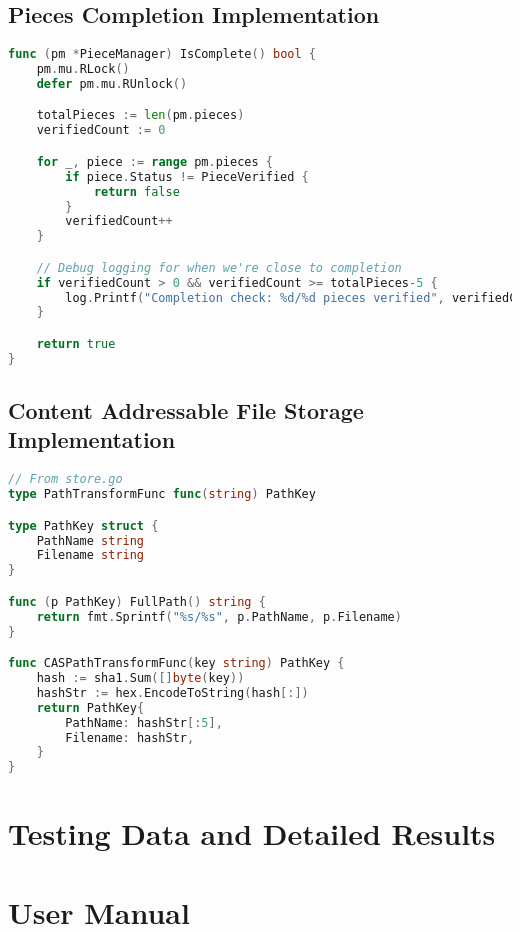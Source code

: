 \documentclass[12pt,a4paper]{report}
\begin{document}
\section{Pieces Completion Implementation}
\begin{lstlisting}[language=Go, caption={Pieces Completion Code}, label={lst:piece-completion}]
func (pm *PieceManager) IsComplete() bool {
	pm.mu.RLock()
	defer pm.mu.RUnlock()

	totalPieces := len(pm.pieces)
	verifiedCount := 0

	for _, piece := range pm.pieces {
		if piece.Status != PieceVerified {
			return false
		}
		verifiedCount++
	}

	// Debug logging for when we're close to completion
	if verifiedCount > 0 && verifiedCount >= totalPieces-5 {
		log.Printf("Completion check: %d/%d pieces verified", verifiedCount, totalPieces)
	}

	return true
}
\end{lstlisting}

\section{Content Addressable File Storage Implementation}
\begin{lstlisting}[language=Go, caption={Content Addressable File/Chunk Code}, label={lst:cas-storage}]
  // From store.go
type PathTransformFunc func(string) PathKey

type PathKey struct {
    PathName string
    Filename string
}

func (p PathKey) FullPath() string {
    return fmt.Sprintf("%s/%s", p.PathName, p.Filename)
}

func CASPathTransformFunc(key string) PathKey {
    hash := sha1.Sum([]byte(key))
    hashStr := hex.EncodeToString(hash[:])
    return PathKey{
        PathName: hashStr[:5],
        Filename: hashStr,
    }
}
\end{lstlisting}

\chapter{Testing Data and Detailed Results}

\chapter{User Manual}

\renewcommand\bibname{References}
\begin{raggedright} %
	
	
\end{raggedright}
\end{document}
